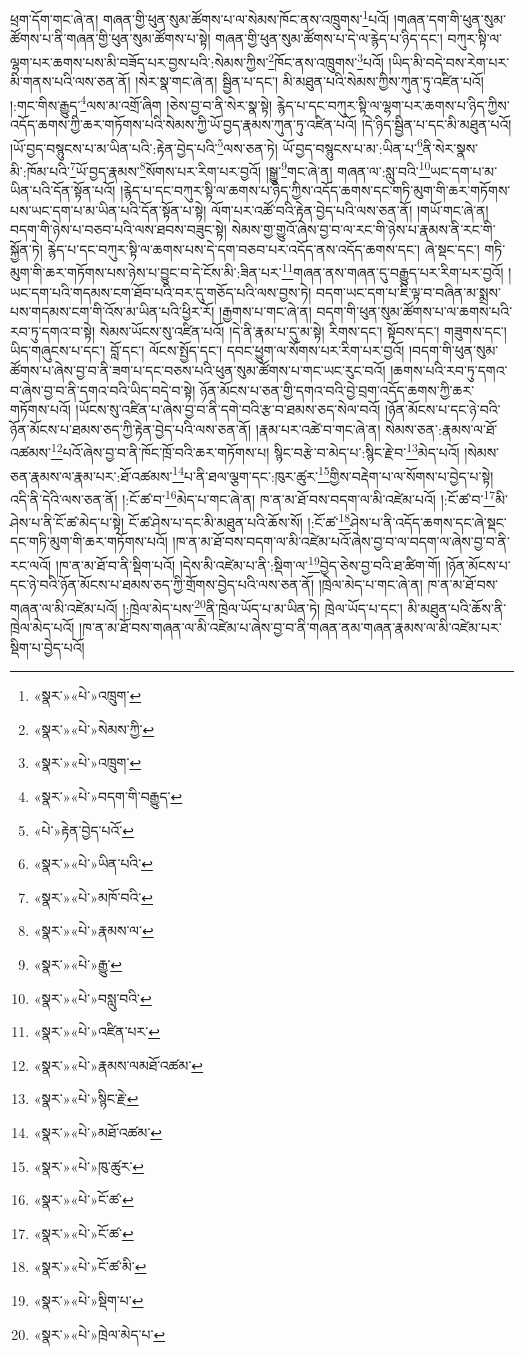 ཕྲག་དོག་གང་ཞེ་ན། གཞན་གྱི་ཕུན་སུམ་ཚོགས་པ་ལ་སེམས་ཁོང་ནས་འཁྲུགས་\footnote{«སྣར་»«པེ་»འཁྲུག་}པའོ། །གཞན་དག་གི་ཕུན་སུམ་ཚོགས་པ་ནི་གཞན་གྱི་ཕུན་སུམ་ཚོགས་པ་སྟེ། གཞན་གྱི་ཕུན་སུམ་ཚོགས་པ་དེ་ལ་རྙེད་པ་ཉིད་དང་། བཀུར་སྟི་ལ་ལྷག་པར་ཆགས་པས་མི་བཟོད་པར་བྱས་པའི་:སེམས་ཀྱིས་\footnote{«སྣར་»«པེ་»སེམས་ཀྱི་}ཁོང་ནས་འཁྲུགས་\footnote{«སྣར་»«པེ་»འཁྲུག་}པའོ། །ཡིད་མི་བདེ་བས་རེག་པར་མི་གནས་པའི་ལས་ཅན་ནོ། །སེར་སྣ་གང་ཞེ་ན། སྦྱིན་པ་དང་། མི་མཐུན་པའི་སེམས་ཀྱིས་ཀུན་ཏུ་འཛིན་པའོ། །:གང་གིས་རྒྱུད་\footnote{«སྣར་»«པེ་»བདག་གི་བརྒྱུད་}ལས་མ་འགྲོ་ཞིག །ཅེས་བྱ་བ་ནི་སེར་སྣ་སྟེ། རྙེད་པ་དང་བཀུར་སྟི་ལ་ལྷག་པར་ཆགས་པ་ཉིད་ཀྱིས་འདོད་ཆགས་ཀྱི་ཆར་གཏོགས་པའི་སེམས་ཀྱི་ཡོ་བྱད་རྣམས་ཀུན་ཏུ་འཛིན་པའོ། །དེ་ཉིད་སྦྱིན་པ་དང་མི་མཐུན་པའོ། །ཡོ་བྱད་བསྙུངས་པ་མ་ཡིན་པའི་:རྟེན་བྱེད་པའི་\footnote{«པེ་»རྟེན་བྱེད་པའོ་}ལས་ཅན་ཏེ། ཡོ་བྱད་བསྙུངས་པ་མ་:ཡིན་པ་\footnote{«སྣར་»«པེ་»ཡིན་པའི་}ནི་སེར་སྣས་མི་:ཁོམ་པའི་\footnote{«སྣར་»«པེ་»མཁོ་བའི་}ཡོ་བྱད་རྣམས་\footnote{«སྣར་»«པེ་»རྣམས་ལ་}སོགས་པར་རིག་པར་བྱའོ། །སྒྱུ་\footnote{«སྣར་»«པེ་»རྒྱུ་}གང་ཞེ་ན། གཞན་ལ་:སླུ་བའི་\footnote{«སྣར་»«པེ་»བསླུ་བའི་}ཡང་དག་པ་མ་ཡིན་པའི་དོན་སྟོན་པའོ། །རྙེད་པ་དང་བཀུར་སྟི་ལ་ཆགས་པ་ཉིད་ཀྱིས་འདོད་ཆགས་དང་གཏི་མུག་གི་ཆར་གཏོགས་པས་ཡང་དག་པ་མ་ཡིན་པའི་དོན་སྟོན་པ་སྟེ། ལོག་པར་འཚོ་བའི་རྟེན་བྱེད་པའི་ལས་ཅན་ནོ། །གཡོ་གང་ཞེ་ན། བདག་གི་ཉེས་པ་བཅབ་པའི་ལས་ཐབས་བཟུང་སྟེ། སེམས་གྱ་གྱུའོ་ཞེས་བྱ་བ་ལ་རང་གི་ཉེས་པ་རྣམས་ནི་རང་གི་སྐྱོན་ཏེ། རྙེད་པ་དང་བཀུར་སྟི་ལ་ཆགས་པས་དེ་དག་བཅབ་པར་འདོད་ནས་འདོད་ཆགས་དང་། ཞེ་སྡང་དང་། གཏི་མུག་གི་ཆར་གཏོགས་པས་ཉེས་པ་བྱུང་བ་དེ་ངོས་མི་:ཟིན་པར་\footnote{«སྣར་»«པེ་»འཛིན་པར་}གཞན་ནས་གཞན་དུ་བརྒྱུད་པར་རིག་པར་བྱའོ། །ཡང་དག་པའི་གདམས་ངག་ཐོབ་པའི་བར་དུ་གཅོད་པའི་ལས་བྱས་ཏེ། བདག་ཡང་དག་པ་ཇི་ལྟ་བ་བཞིན་མ་སྨྲས་པས་གདམས་ངག་གི་འོས་མ་ཡིན་པའི་ཕྱིར་རོ། །རྒྱགས་པ་གང་ཞེ་ན། བདག་གི་ཕུན་སུམ་ཚོགས་པ་ལ་ཆགས་པའི་རབ་ཏུ་དགའ་བ་སྟེ། སེམས་ཡོངས་སུ་འཛིན་པའོ། །དེ་ནི་རྣམ་པ་དུ་མ་སྟེ། རིགས་དང་། སྟོབས་དང་། གཟུགས་དང་། ཡིད་གཞུངས་པ་དང་། བློ་དང་། ལོངས་སྤྱོད་དང་། དབང་ཕྱུག་ལ་སོགས་པར་རིག་པར་བྱའོ། །བདག་གི་ཕུན་སུམ་ཚོགས་པ་ཞེས་བྱ་བ་ནི་ཟག་པ་དང་བཅས་པའི་ཕུན་སུམ་ཚོགས་པ་གང་ཡང་རུང་བའོ། །ཆགས་པའི་རབ་ཏུ་དགའ་བ་ཞེས་བྱ་བ་ནི་དགའ་བའི་ཡིད་བདེ་བ་སྟེ། ཉོན་མོངས་པ་ཅན་གྱི་དགའ་བའི་བྱེ་བྲག་འདོད་ཆགས་ཀྱི་ཆར་གཏོགས་པའོ། །ཡོངས་སུ་འཛིན་པ་ཞེས་བྱ་བ་ནི་དགེ་བའི་རྩ་བ་ཐམས་ཅད་སེལ་བའོ། །ཉོན་མོངས་པ་དང་ཉེ་བའི་ཉོན་མོངས་པ་ཐམས་ཅད་ཀྱི་རྟེན་བྱེད་པའི་ལས་ཅན་ནོ། །རྣམ་པར་འཚེ་བ་གང་ཞེ་ན། སེམས་ཅན་:རྣམས་ལ་ཐོ་འཚམས་\footnote{«སྣར་»«པེ་»རྣམས་ལམཐོ་འཚམ་}པའོ་ཞེས་བྱ་བ་ནི་ཁོང་ཁྲོ་བའི་ཆར་གཏོགས་པ། སྙིང་བརྩེ་བ་མེད་པ་:སྙིང་རྗེ་བ་\footnote{«སྣར་»«པེ་»སྙིང་རྗེ་}མེད་པའོ། །སེམས་ཅན་རྣམས་ལ་རྣམ་པར་:ཐོ་འཚམས་\footnote{«སྣར་»«པེ་»མཐོ་འཚམ་}པ་ནི་ཐལ་ལྕག་དང་:ཁུར་ཚུར་\footnote{«སྣར་»«པེ་»ཁུ་ཚུར་}གྱིས་བརྡེག་པ་ལ་སོགས་པ་བྱེད་པ་སྟེ། འདི་ནི་དེའི་ལས་ཅན་ནོ། །:ངོ་ཚ་བ་\footnote{«སྣར་»«པེ་»ངོ་ཚ་}མེད་པ་གང་ཞེ་ན། ཁ་ན་མ་ཐོ་བས་བདག་ལ་མི་འཛེམ་པའོ། །:ངོ་ཚ་བ་\footnote{«སྣར་»«པེ་»ངོ་ཚ་}མི་ཤེས་པ་ནི་ངོ་ཚ་མེད་པ་སྟེ། ངོ་ཚ་ཤེས་པ་དང་མི་མཐུན་པའི་ཆོས་སོ། །:ངོ་ཚ་\footnote{«སྣར་»«པེ་»ངོ་ཚ་མི་}ཤེས་པ་ནི་འདོད་ཆགས་དང་ཞེ་སྡང་དང་གཏི་མུག་གི་ཆར་གཏོགས་པའོ། །ཁ་ན་མ་ཐོ་བས་བདག་ལ་མི་འཛེམ་པའོ་ཞེས་བྱ་བ་ལ་བདག་ལ་ཞེས་བྱ་བ་ནི་རང་ལའོ། །ཁ་ན་མ་ཐོ་བ་ནི་སྡིག་པའོ། །དེས་མི་འཛེམ་པ་ནི་:སྡིག་ལ་\footnote{«སྣར་»«པེ་»སྡིག་པ་}བྱེད་ཅེས་བྱ་བའི་ཐ་ཚིག་གོ། །ཉོན་མོངས་པ་དང་ཉེ་བའི་ཉོན་མོངས་པ་ཐམས་ཅད་ཀྱི་གྲོགས་བྱེད་པའི་ལས་ཅན་ནོ། །ཁྲེལ་མེད་པ་གང་ཞེ་ན། ཁ་ན་མ་ཐོ་བས་གཞན་ལ་མི་འཛེམ་པའོ། །:ཁྲེལ་མེད་པས་\footnote{«སྣར་»«པེ་»ཁྲེལ་མེད་པ་}ནི་ཁྲེལ་ཡོད་པ་མ་ཡིན་ཏེ། ཁྲེལ་ཡོད་པ་དང་། མི་མཐུན་པའི་ཆོས་ནི་ཁྲེལ་མེད་པའོ། །ཁ་ན་མ་ཐོ་བས་གཞན་ལ་མི་འཛེམ་པ་ཞེས་བྱ་བ་ནི་གཞན་ནམ་གཞན་རྣམས་ལ་མི་འཛེམ་པར་སྡིག་པ་བྱེད་པའོ། 